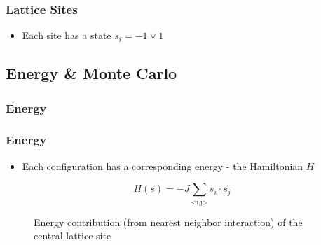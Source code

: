 \documentclass{beamer}
\newcommand{\tikzfigC}[2]{\begin{figure}[h]\begin{center}\end{center}\caption{{#2}}\end{figure}}
\begin{document}
\begin{frame}\frametitle{Lattice Sites}
\begin{itemize}
\item Each site has a state $s_i = -1\lor1$
\end{itemize}
\end{frame}


\subsection{Energy \& Monte Carlo}
\subsubsection{Energy}
\begin{frame}\frametitle{Energy}
\begin{itemize}
\item Each configuration has a corresponding energy - the Hamiltonian $H$
\end{itemize}
\end{frame}

\begin{frame}
\begin{equation*}
H(s)= -J \sum_{\text{<i,j>}}s_i\cdot s_j
\end{equation*}\tikzfigC{Examples}{Energy contribution (from nearest neighbor interaction) of the central lattice site}
\end{frame}
\end{document}
